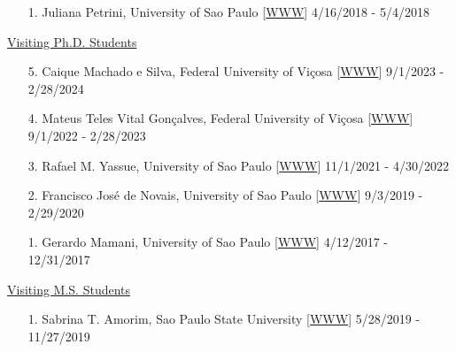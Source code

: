 \documentclass[margin,line,10pt]{res}
\begin{document}
\begin{resume}
\begin{enumerate}
\item [1.] Juliana Petrini,  University of Sao Paulo  [\textcolor{blue}{\href{https://www.researchgate.net/profile/Juliana_Petrini}{WWW}}]  \hfill  4/16/2018 - 5/4/2018
\end{enumerate}






\begin{flushleft}
\hspace{0.2cm} \underline{Visiting Ph.D. Students}
\end{flushleft}
\begin{enumerate}

  \item [5.] Caique Machado e Silva, Federal University of Vi\c cosa [\textcolor{blue}{\href{https://www.researchgate.net/profile/Caique-Silva}{WWW}}]  \hfill  9/1/2023 - 2/28/2024

  \vspace{0.3cm}

  \item [4.] Mateus Teles Vital Gon\c calves, Federal University of Vi\c cosa [\textcolor{blue}{\href{https://goncalvesmateu.github.io}{WWW}}]  \hfill  9/1/2022 - 2/28/2023

  \vspace{0.3cm}

\item [3.] Rafael M. Yassue, University of Sao Paulo [\textcolor{blue}{\href{https://rafaelyassue.github.io/cv-online/}{WWW}}]  \hfill  11/1/2021 - 4/30/2022

    \vspace{0.3cm}

\item [2.] Francisco Jos\'{e} de Novais,  University of Sao Paulo [\textcolor{blue}{\href{https://fjnovais.github.io/}{WWW}}]  \hfill  9/3/2019 - 2/29/2020

\vspace{0.3cm}

\item [1.] Gerardo Mamani, University of Sao Paulo  [\textcolor{blue}{\href{https://github.com/gerardocorn}{WWW}}]  \hfill 4/12/2017 - 12/31/2017
\end{enumerate}



\begin{flushleft}
\hspace{0.2cm} \underline{Visiting M.S. Students}
\end{flushleft}
\begin{enumerate}
\item [1.] Sabrina T. Amorim, Sao Paulo State University [\textcolor{blue}{\href{https://sabrinaam.github.io/}{WWW}}]  \hfill 5/28/2019 - 11/27/2019
\end{enumerate}



\end{resume}
\end{document}
